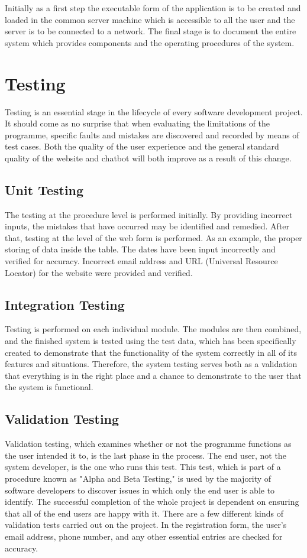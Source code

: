 Initially as a first step the executable form of the application is to be created and loaded in the common server machine which is accessible to all the user and the server is to be connected to a network. The final stage is to document the entire system which provides components and the operating procedures of the system.

\section{Testing}
Testing is an essential stage in the lifecycle of every software development project. It should come as no surprise that when evaluating the limitations of the programme, specific faults and mistakes are discovered and recorded by means of test cases. Both the quality of the user experience and the general standard quality of the website and chatbot will both improve as a result of this change.

\subsection{Unit Testing}
The testing at the procedure level is performed initially. By providing incorrect inputs, the mistakes that have occurred may be identified and remedied. After that, testing at the level of the web form is performed. As an example, the proper storing of data inside the table. The dates have been input incorrectly and verified for accuracy. Incorrect email address and URL (Universal Resource Locator) for the website were provided and verified.

\subsection{Integration Testing}
Testing is performed on each individual module. The modules are then combined, and the finished system is tested using the test data, which has been specifically created to demonstrate that the functionality of the system correctly in all of its features and situations. Therefore, the system testing serves both as a validation that everything is in the right place and a chance to demonstrate to the user that the system is functional.

\subsection{Validation Testing}
Validation testing, which examines whether or not the programme functions as the user intended it to, is the last phase in the process. The end user, not the system developer, is the one who runs this test. This test, which is part of a procedure known as "Alpha and Beta Testing," is used by the majority of software developers to discover issues in which only the end user is able to identify. The successful completion of the whole project is dependent on ensuring that all of the end users are happy with it. There are a few different kinds of validation tests carried out on the project. In the registration form, the user's email address, phone number, and any other essential entries are checked for accuracy.

